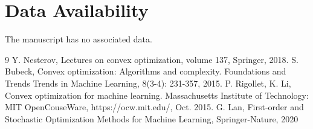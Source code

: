 \section*{Data Availability}
The manuscript has no associated data.

\begin{thebibliography}{9}
Y. Nesterov, Lectures on convex optimization, volume 137, Springer, 2018.
S. Bubeck, Convex optimization: Algorithms and complexity. Foundations
and Trends Trends{\textregistered} in Machine Learning, 8(3-4): 231-357, 2015.
P. Rigollet, K. Li, Convex optimization for machine learning. Massachusetts
Institute of Technology: MIT OpenCouseWare, https://ocw.mit.edu/, Oct. 2015.
G. Lan, First-order and Stochastic Optimization Methods for Machine Learning, Springer-Nature, 2020
\end{thebibliography}
%




